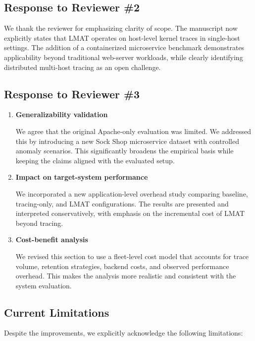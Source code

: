 \documentclass[11pt]{article}
\begin{document}
\subsection*{Response to Reviewer \#2}

We thank the reviewer for emphasizing clarity of scope. The manuscript now explicitly states that LMAT operates on host-level kernel traces in single-host settings. The addition of a containerized microservice benchmark demonstrates applicability beyond traditional web-server workloads, while clearly identifying distributed multi-host tracing as an open challenge.

\subsection*{Response to Reviewer \#3}

\begin{enumerate}[leftmargin=1.5em]

\item \textbf{Generalizability validation}

We agree that the original Apache-only evaluation was limited. We addressed this by introducing a new Sock Shop microservice dataset with controlled anomaly scenarios. This significantly broadens the empirical basis while keeping the claims aligned with the evaluated setup.

\item \textbf{Impact on target-system performance}

We incorporated a new application-level overhead study comparing baseline, tracing-only, and LMAT configurations. The results are presented and interpreted conservatively, with emphasis on the incremental cost of LMAT beyond tracing.

\item \textbf{Cost-benefit analysis}

We revised this section to use a fleet-level cost model that accounts for trace volume, retention strategies, backend costs, and observed performance overhead. This makes the analysis more realistic and consistent with the system evaluation.

\end{enumerate}

\subsection*{Current Limitations}

Despite the improvements, we explicitly acknowledge the following limitations:
\end{document}
